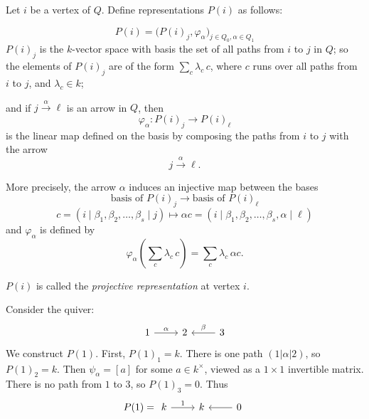 \documentclass[11pt, a4paper]{report}
\begin{document}
\begin{definition}
    Let $i$ be a vertex of $Q$. Define representations $P(i)$
    as follows:

    \[
        P(i)=\bigl(P(i)_j,\varphi_\alpha\bigr)_{j\in Q_0,\alpha\in Q_1}
    \]
    $P(i)_j$ is the $k$-vector space with basis the set of all paths from $i$ to $j$
    in $Q$; so the elements of $P(i)_j$ are of the form $\sum_c \lambda_c\, c$, where $c$
    runs over all paths from $i$ to $j$, and $\lambda_c\in k$;

    and if $j \xrightarrow{\alpha} \ell$ is an arrow in $Q$, then
    \[
        \varphi_\alpha : P(i)_j \longrightarrow P(i)_\ell
    \]
    is the linear map defined on the basis by composing the paths from $i$ to $j$ with the arrow
    \[
        j \xrightarrow{\alpha} \ell.
    \]

    More precisely, the arrow $\alpha$ induces an injective map between the bases
    \[
        \text{basis of } P(i)_j \longrightarrow \text{basis of } P(i)_\ell
    \]
    \[
        c=(i \mid \beta_1,\beta_2,\ldots,\beta_s \mid j)\longmapsto \alpha c
        =(i \mid \beta_1,\beta_2,\ldots,\beta_s,\alpha \mid \ell)
    \]
    and $\varphi_\alpha$ is defined by
    \[
        \varphi_\alpha\left(\sum_c \lambda_c\, c\right)=\sum_c \lambda_c\, \alpha c.
    \]

    $P(i)$ is called the \emph{projective representation} at vertex $i$.
\end{definition}

\begin{example}
    Consider the quiver:
    \[
        \begin{tikzcd}
            1 \arrow[r, "\alpha"] & 2 & 3 \arrow[l, "\beta"']
        \end{tikzcd}
    \]
    We construct $P(1)$. First, $P(1)_1=k$. There is one path $(1|\alpha|2)$, so $P(1)_2=k$. Then $\psi_\alpha=[a]$ for some $a \in k^{\times}$, viewed as a $1 \times 1$ invertible matrix. There is no path from $1$ to $3$, so $P(1)_3=0$. Thus
    \[
        P(1)= \begin{tikzcd}
            k \arrow[r, "1"] & k & 0 \arrow[l]
        \end{tikzcd}
    \]
\end{example}
\end{document}
